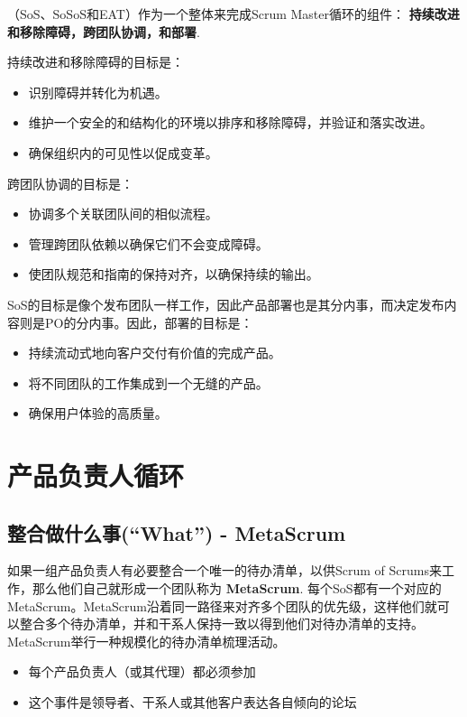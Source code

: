 \documentclass[12pt,a4paper,parskip=full]{scrartcl}
\begin{document}
\begin{CJK*}{UTF8}{gbsn}
（SoS、SoSoS和EAT）作为一个整体来完成Scrum Master循环的组件： \textbf{持续改进和移除障碍，跨团队协调，和部署}.

持续改进和移除障碍的目标是：

\begin{itemize}
\item 识别障碍并转化为机遇。
\item 维护一个安全的和结构化的环境以排序和移除障碍，并验证和落实改进。
\item 确保组织内的可见性以促成变革。
\end{itemize}

跨团队协调的目标是：
\begin{itemize}
\item 协调多个关联团队间的相似流程。
\item 管理跨团队依赖以确保它们不会变成障碍。
\item 使团队规范和指南的保持对齐，以确保持续的输出。
\end{itemize}

SoS的目标是像个发布团队一样工作，因此产品部署也是其分内事，而决定发布内容则是PO的分内事。因此，部署的目标是：
\begin{itemize}
\item 持续流动式地向客户交付有价值的完成产品。
\item 将不同团队的工作集成到一个无缝的产品。
\item 确保用户体验的高质量。
\end{itemize}

\section{产品负责人循环}
\subsection{整合做什么事(“What”) - MetaScrum}
如果一组产品负责人有必要整合一个唯一的待办清单，以供Scrum of Scrums来工作，那么他们自己就形成一个团队称为 \textbf{MetaScrum}.
每个SoS都有一个对应的MetaScrum。MetaScrum沿着同一路径来对齐多个团队的优先级，这样他们就可以整合多个待办清单，并和干系人保持一致以得到他们对待办清单的支持。MetaScrum举行一种规模化的待办清单梳理活动。

\begin{itemize}
\item 每个产品负责人（或其代理）都必须参加
\item 这个事件是领导者、干系人或其他客户表达各自倾向的论坛
\end{itemize}


\end{CJK*}
\end{document}
